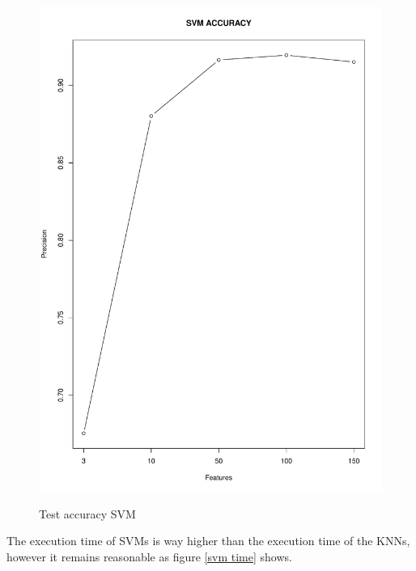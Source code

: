 \documentclass{article}
\begin{document}
\begin{figure}[H]
\begin{adjustwidth}{-4cm}{-4cm}
{    \includegraphics[scale=0.3]{../svm_accuracy_rgb.pdf}  
     }
     \centering
     \caption{Test accuracy SVM} \label{svmaccuracy}
      \end{adjustwidth}
   \end{figure}

\noindent The execution time of SVMs is way higher than the execution time of the KNNs, however it remains reasonable as figure \ref{svm time} shows.
   
\end{document}
